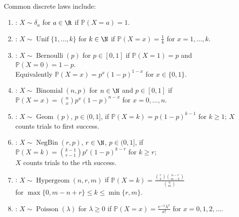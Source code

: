 \begin{definition} \label{def:core-discrete-distributions} \\
Common discrete laws include:
\begin{enumerate}[label=(\roman*)]
\setlength{\itemsep}{0pt}
\item {}: $X\sim\delta_a$ for $a\in\R$ if $\mathbb{P}(X=a)=1$.
\item {}: $X\sim\operatorname{Unif}\{1,\ldots,k\}$ for $k\in\N$ if $\mathbb{P}(X=x)=\frac{1}{k}$ for $x=1,\ldots,k$.
\item {}: $X\sim\operatorname{Bernoulli}(p)$ for $p\in[0,1]$ if $\mathbb{P}(X=1)=p$ and $\mathbb{P}(X=0)=1-p$.\\
Equivalently $\mathbb{P}(X=x)=p^x(1-p)^{1-x}$ for $x\in\{0,1\}$.
\item {}: $X\sim\operatorname{Binomial}(n,p)$ for $n\in\N$ and $p\in[0,1]$ if $\mathbb{P}(X=x)=\binom{n}{x}p^x(1-p)^{n-x}$ for $x=0,\ldots,n$.
\item {}: $X\sim\operatorname{Geom}(p)$, $p\in(0,1]$, if $\mathbb{P}(X=k)=p(1-p)^{k-1}$ for $k\geq1$; $X$ counts trials to first success.
\item {}: $X\sim\operatorname{NegBin}(r,p)$, $r\in\N$, $p\in(0,1]$, if $\mathbb{P}(X=k)=\binom{k-1}{r-1}p^r(1-p)^{k-r}$ for $k\geq r$;\\
$X$ counts trials to the $r$th success.
\item {}: $X\sim\operatorname{Hypergeom}(n,r,m)$ if $\mathbb{P}(X=k)=\frac{\binom{r}{k}\binom{n-r}{m-k}}{\binom{n}{m}}$\\
for $\max\{0,m-n+r\}\leq k\leq\min\{r,m\}$.
\item {}: $X\sim\operatorname{Poisson}(\lambda)$ for $\lambda\geq0$ if $\mathbb{P}(X=x)=\frac{e^{-\lambda}\lambda^x}{x!}$ for $x=0,1,2,\ldots$.
\end{enumerate}
\end{definition}

